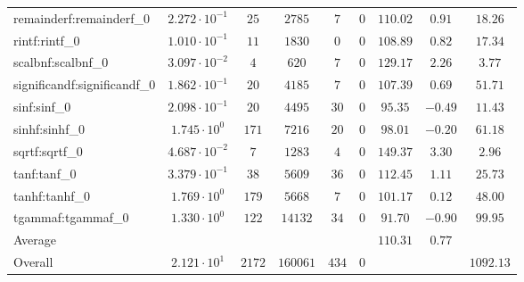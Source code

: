 \begin{tabular}{|l|c|c|c|c|c|c|c|c|}
remainderf:remainderf\_0     & $ 2.272 \cdot 10^{-1} $ & $ 25     $ & $ 2785   $ & $ 7   $ & $ 0   $ & $ 110.02      $ & $ 0.91    $ & $ 18.26   $ \\
rintf:rintf\_0               & $ 1.010 \cdot 10^{-1} $ & $ 11     $ & $ 1830   $ & $ 0   $ & $ 0   $ & $ 108.89      $ & $ 0.82    $ & $ 17.34   $ \\
scalbnf:scalbnf\_0           & $ 3.097 \cdot 10^{-2} $ & $ 4      $ & $ 620    $ & $ 7   $ & $ 0   $ & $ 129.17      $ & $ 2.26    $ & $ 3.77    $ \\
significandf:significandf\_0 & $ 1.862 \cdot 10^{-1} $ & $ 20     $ & $ 4185   $ & $ 7   $ & $ 0   $ & $ 107.39      $ & $ 0.69    $ & $ 51.71   $ \\
sinf:sinf\_0                 & $ 2.098 \cdot 10^{-1} $ & $ 20     $ & $ 4495   $ & $ 30  $ & $ 0   $ & $ 95.35       $ & $ -0.49   $ & $ 11.43   $ \\
sinhf:sinhf\_0               & $ 1.745 \cdot 10^{0}  $ & $ 171    $ & $ 7216   $ & $ 20  $ & $ 0   $ & $ 98.01       $ & $ -0.20   $ & $ 61.18   $ \\
sqrtf:sqrtf\_0               & $ 4.687 \cdot 10^{-2} $ & $ 7      $ & $ 1283   $ & $ 4   $ & $ 0   $ & $ 149.37      $ & $ 3.30    $ & $ 2.96    $ \\
tanf:tanf\_0                 & $ 3.379 \cdot 10^{-1} $ & $ 38     $ & $ 5609   $ & $ 36  $ & $ 0   $ & $ 112.45      $ & $ 1.11    $ & $ 25.73   $ \\
tanhf:tanhf\_0               & $ 1.769 \cdot 10^{0}  $ & $ 179    $ & $ 5668   $ & $ 7   $ & $ 0   $ & $ 101.17      $ & $ 0.12    $ & $ 48.00   $ \\
tgammaf:tgammaf\_0           & $ 1.330 \cdot 10^{0}  $ & $ 122    $ & $ 14132  $ & $ 34  $ & $ 0   $ & $ 91.70       $ & $ -0.90   $ & $ 99.95   $ \\
\hline
Average                      & $                     $ & $        $ & $        $ & $     $ & $     $ & $ 110.31      $ & $ 0.77    $ & $         $ \\
\hline
Overall                      & $ 2.121 \cdot 10^{1}  $ & $ 2172   $ & $ 160061 $ & $ 434 $ & $ 0   $ & $             $ & $         $ & $ 1092.13 $ \\
\hline
\end{tabular}
